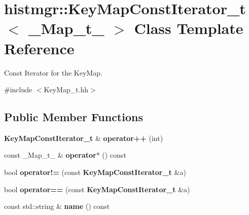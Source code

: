 \section{histmgr\-:\-:Key\-Map\-Const\-Iterator\-\_\-t$<$ \-\_\-\-Map\-\_\-t\-\_\- $>$ Class Template Reference}
\label{classhistmgr_1_1KeyMapConstIterator__t}


Const Iterator for the Key\-Map.  




{\ttfamily \#include $<$Key\-Map\-\_\-t.\-hh$>$}

\subsection*{Public Member Functions}
\begin{DoxyCompactItemize}
\item 
{\bf Key\-Map\-Const\-Iterator\-\_\-t} \& {\bfseries operator++} (int)\label{classhistmgr_1_1KeyMapConstIterator__t_a836ba25c49adada842fbae460c128324}

\item 
const \-\_\-\-Map\-\_\-t\-\_\- \& {\bfseries operator$\ast$} () const \label{classhistmgr_1_1KeyMapConstIterator__t_ab5b2ed2dd09f955fac73a81ea946a279}

\item 
bool {\bfseries operator!=} (const {\bf Key\-Map\-Const\-Iterator\-\_\-t} \&a)\label{classhistmgr_1_1KeyMapConstIterator__t_a6287d9b0a5a0416e7fb7148b4e7c8d50}

\item 
bool {\bfseries operator==} (const {\bf Key\-Map\-Const\-Iterator\-\_\-t} \&a)\label{classhistmgr_1_1KeyMapConstIterator__t_a1d8772a655ce9206fc4ca55ec1180d10}

\item 
const std\-::string \& {\bfseries name} () const \label{classhistmgr_1_1KeyMapConstIterator__t_a177a0274749f6e1886bc635f710ee8ab}

\end{DoxyCompactItemize}
